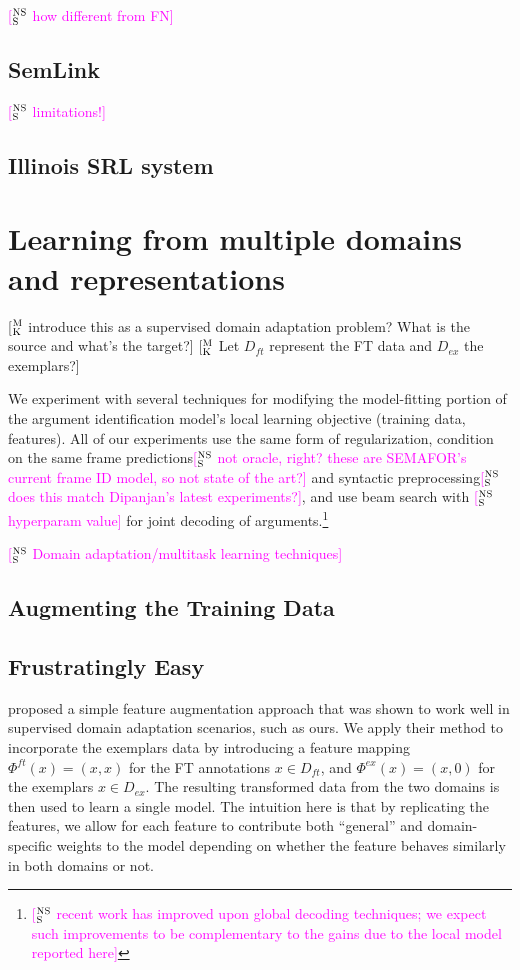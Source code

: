 \documentclass[11pt,a4paper]{article}
\newcommand{\ensuretext}[1]{#1}
\newcommand{\nssmarker}{\ensuretext{\textcolor{magenta}{\ensuremath{^{\textsc{NS}}_{\textsc{S}}}}}}
\newcommand{\mkmarker}{\ensuretext{\textcolor{mdgreen}{\ensuremath{^{\textsc{M}}_{\textsc{K}}}}}}
\newcommand{\arkcomment}[3]{\ensuretext{\textcolor{#3}{[#1 #2]}}}
\newcommand{\nss}[1]{\arkcomment{\nssmarker}{#1}{magenta}}
\newcommand{\mk}[1]{\arkcomment{\mkmarker}{#1}{mdgreen}}
\begin{document}
\nss{how different from FN}

\subsection{SemLink}\label{sec:semlink}

\nss{limitations!}

\subsection{Illinois SRL system}



\section{Learning from multiple domains and representations}


\mk{introduce this as a supervised domain adaptation problem? What is the source and what's the target?}
\mk{Let $D_{ft}$ represent the FT data and $D_{ex}$ the exemplars?}

We experiment with several techniques for modifying the model-fitting portion of 
the argument identification model's local learning objective 
(training data, features). All of our experiments use the same form of regularization, 
condition on the same frame predictions\nss{not oracle, right? these are SEMAFOR's current frame ID model, so not state of the art?} 
and syntactic preprocessing\nss{does this match Dipanjan's latest experiments?}, 
and use beam search with \nss{hyperparam value} for joint decoding of arguments.\footnote{\nss{recent work has improved upon global decoding techniques; we expect such improvements to be complementary to the gains due to the local model reported here}}

\nss{Domain adaptation/multitask learning techniques}

\subsection{Augmenting the Training Data}

\subsection{Frustratingly Easy}
\cite{daume-2009} proposed a simple feature augmentation approach that was shown to work well in supervised domain adaptation scenarios, 
such as ours. We apply their method to incorporate the exemplars data by introducing a feature mapping $\Phi^{ft}(x) = (x, x)$ for the
FT annotations $x \in D_{ft}$, and $\Phi^{ex}(x) = (x, 0)$ for the exemplars $x \in D_{ex}$. The resulting transformed data 
from the two domains is then used to learn a single model. The intuition here is that by replicating the features, we allow for
each feature to contribute both ``general'' and domain-specific weights to the model depending on whether the feature
behaves similarly in both domains or not.
\end{document}
